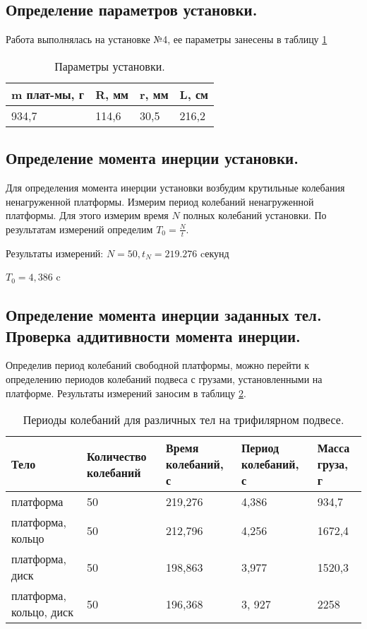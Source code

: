 \documentclass[12pt,a4paper]{article}
\begin{document}
	\subsection{Определение параметров установки.}

		Работа выполнялась на установке №4, ее параметры занесены в таблицу \ref{tab:parametrs}
		\begin{table}[h!]
			\begin{center}
			\begin{tabular}{| l | l | l | l |}
					\hline
					m плат-мы, г & R, мм & r, мм & L, см \\ \hline
					934,7 & 114,6 & 30,5 & 216,2 \\
					\hline
				\end{tabular}
			\end{center}
			\caption{Параметры установки.}
			\label{tab:parametrs}
		\end{table}

	\subsection{Определение момента инерции установки.}

		\qquad Для определения момента инерции установки возбудим крутильные колебания ненагруженной платформы. Измерим период колебаний ненагруженной платформы. Для этого измерим время $N$ полных колебаний установки. По результатам измерений определим $ T_{0} = \frac{N}{t}$.

		Результаты измерений: $ N = 50, t_{N} = 219.276$ cекунд

		 $T_{0} = 4,386$ c
	\subsection{Определение момента инерции заданных тел. Проверка аддитивности момента инерции.}

		Определив период колебаний свободной платформы, можно перейти к определению периодов колебаний подвеса с грузами, установленными на платформе. Результаты измерений заносим в таблицу \ref{tab:periods_diff_body}.

		\begin{table}[ht!]
			\begin{center}
			\begin{tabular}{| p{65pt} | p{65pt} | p{55pt} | p{60pt}  | p{60pt} |}
					\hline
					Тело & Количество колебаний & Время колебаний, с & Период колебаний, с & Масса груза, г \\ \hline
					платформа & 50 & 219,276 & 4,386 & 934,7 \\ \hline
					платформа, кольцо & 50 & 212,796 & 4,256 & 1672,4 \\ \hline
					платформа, диск & 50 & 198,863 & 3,977 & 1520,3 \\ \hline
					платформа, кольцо, диск & 50 & 196,368 & 3, 927 & 2258 \\
					\hline
				\end{tabular}
			\end{center}
			\caption{Периоды колебаний для различных тел на трифилярном подвесе.}
			\label{tab:periods_diff_body}
		\end{table}
\end{document}
